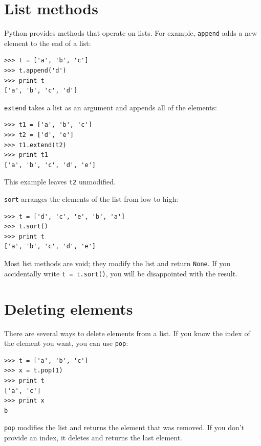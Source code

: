\documentclass[10pt]{book}
\begin{document}
\section{List methods}


Python provides methods that operate on lists.  For example,
{\tt append} adds a new element to the end of a list:


\beforeverb
\begin{verbatim}
>>> t = ['a', 'b', 'c']
>>> t.append('d')
>>> print t
['a', 'b', 'c', 'd']
\end{verbatim}
\afterverb
%
{\tt extend} takes a list as an argument and appends all of
the elements:


\beforeverb
\begin{verbatim}
>>> t1 = ['a', 'b', 'c']
>>> t2 = ['d', 'e']
>>> t1.extend(t2)
>>> print t1
['a', 'b', 'c', 'd', 'e']
\end{verbatim}
\afterverb
%
This example leaves {\tt t2} unmodified.

{\tt sort} arranges the elements of the list from low to high:


\beforeverb
\begin{verbatim}
>>> t = ['d', 'c', 'e', 'b', 'a']
>>> t.sort()
>>> print t
['a', 'b', 'c', 'd', 'e']
\end{verbatim}
\afterverb
%
Most list methods are void; they modify the list and return {\tt None}.
If you accidentally write {\tt t = t.sort()}, you will be disappointed
with the result.


\section{Deleting elements}


There are several ways to delete elements from a list.  If you
know the index of the element you want, you can use
{\tt pop}:


\beforeverb
\begin{verbatim}
>>> t = ['a', 'b', 'c']
>>> x = t.pop(1)
>>> print t
['a', 'c']
>>> print x
b
\end{verbatim}
\afterverb
%
{\tt pop} modifies the list and returns the element that was removed.
If you don't provide an index, it deletes and returns the
last element.
\end{document}
